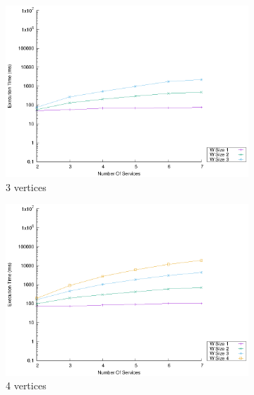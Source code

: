 \begin{figure}[!htb]
  \centering
  \begin{subfigure}{0.33\textwidth}
    \includegraphics[width=\textwidth]{Images/graphs/window_time_performance_n7_s7_50_89_n3}
    \caption{3 vertices}
    \label{fig:time_window_perce_wide_3n}
  \end{subfigure}
  \hfill
  \begin{subfigure}{0.33\textwidth}
    \includegraphics[width=\textwidth]{Images/graphs/window_time_performance_n7_s7_50_89_n4}
    \caption{4 vertices}
    \label{fig:time_window_perce_wide_4n}
  \end{subfigure}
  \hfill
  \begin{subfigure}{0.33\textwidth}

\end{subfigure}
\end{figure}
